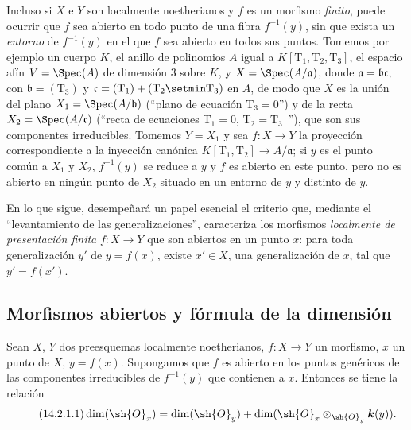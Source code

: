 \begin{remark}[14.1.5]
\label{IV.14.1.5}
Incluso si $X$ e $Y$ son localmente noetherianos y $f$ es un morfismo \emph{finito}, puede ocurrir que $f$ sea abierto en todo punto de una fibra $f^{-1}(y)$, sin que exista un \emph{entorno} de $f^{-1}(y)$ en el que $f$ sea abierto en todos sus puntos.
Tomemos por ejemplo un cuerpo $K$, el anillo de polinomios $A$ igual a $K[\mathrm{T}_1,\mathrm{T}_2,\mathrm{T}_3]$, el espacio afín $V=\Spec(A)$ de dimensión $3$ sobre $K$, y $X=\Spec(A/\mathfrak{a})$, donde $\mathfrak{a}=\mathfrak{b}\mathfrak{c}$, con $\mathfrak{b}=(\mathrm{T}_3)$ y $\mathfrak{c}=(\mathrm{T}_1)+(\mathrm{T}_2\setmin\mathrm{T}_3)$ en $A$, de modo que $X$ es la unión del plano $X_1=\Spec(A/\mathfrak{b})$ (``plano de ecuación $\mathrm{T}_3=0$'') y de la recta $X_2=\Spec(A/\mathfrak{c})$ (``recta de ecuaciones $\mathrm{T}_1=0$, $\mathrm{T}_2=\mathrm{T}_3$~''), que son sus componentes irreducibles.
Tomemos $Y=X_1$ y sea $f:X\to Y$ la proyección correspondiente a la inyección canónica $K[\mathrm{T}_1,\mathrm{T}_2]\to A/\mathfrak{a}$; si $y$ es el punto común a $X_1$ y $X_2$, $f^{-1}(y)$ se reduce a $y$ y $f$ es abierto en este punto, pero no es abierto en ningún punto de $X_2$ situado en un entorno de $y$ y distinto de $y$.
\end{remark}

\begin{env}[14.1.6]
\label{IV.14.1.6}
En lo que sigue, desempeñará un papel esencial el criterio  que, mediante el ``levantamiento de las generalizaciones'', caracteriza los morfismos \emph{localmente de presentación finita} $f:X\to Y$ que son abiertos en un punto $x$: para toda generalización $y'$ de $y=f(x)$, existe $x'\in X$, una generalización de $x$, tal que $y'=f(x')$.
\end{env}

\subsection{Morfismos abiertos y fórmula de la dimensión}
\label{subsection:IV.14.2}

\begin{theorem}[14.2.1]
\label{IV.14.2.1}
Sean $X$, $Y$ dos preesquemas localmente noetherianos, $f:X\to Y$ un morfismo, $x$ un punto de $X$, $y=f(x)$.
Supongamos que $f$ es abierto en los puntos genéricos de las componentes irreducibles de $f^{-1}(y)$ que contienen a $x$.
Entonces se tiene la relación
\begin{equation}
\tag{14.2.1.1}
\label{IV.14.2.1.1}
  \dim(\sh{O}_x)=\dim(\sh{O}_y)+\dim(\sh{O}_x\otimes_{\sh{O}_y}\boldsymbol k(y)).
\end{equation}
\end{theorem}

